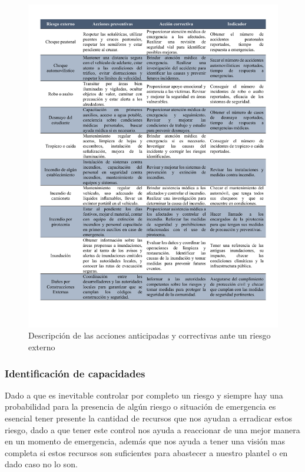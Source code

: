     \begin{figure}[H]
        \centering
        \includegraphics[trim = {10mm 20mm 10mm 10mm},clip,scale=0.41]{22/Img/riesgosExternos2.pdf}
        \caption{Descripción de las acciones anticipadas y correctivas ante un riesgo externo}
        \label{fig:accionAntExterno}
    \end{figure}
    
    \subsubsection{Identificación de capacidades}
    
    
    Dado a que es inevitable controlar por completo un riesgo y siempre hay una probabilidad para la presencia de algún riesgo o situación de emergencia es esencial tener presente la cantidad de recursos que nos ayudan a erradicar estos riesgo, dado a que tener este control nos ayuda a reaccionar de una mejor manera en un momento de emergencia, además que nos ayuda a tener una visión mas completa si estos recursos son suficientes para abastecer a nuestro plantel o en dado caso no lo son.
    
